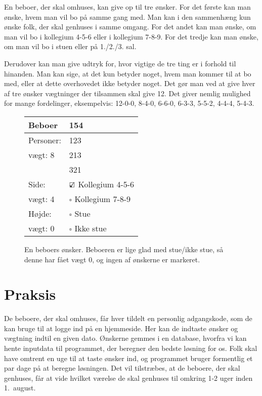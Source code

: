 \documentclass[article,oneside,11pt]{memoir}
\begin{document}
En beboer, der skal omhuses, kan give op til tre ønsker. For det første kan man
ønske, hvem man vil bo på samme gang med. Man kan i den sammenhæng kun ønske
folk, der skal genhuses i samme omgang. For det andet kan man ønske, om man vil
bo i kollegium 4-5-6 eller i kollegium 7-8-9. For
det tredje kan man ønske, om man vil bo i stuen eller på 1./2./3. sal.

Derudover kan man give udtryk for, hvor vigtige de tre ting er i forhold til
hinanden. Man kan sige, at det kun betyder noget, hvem man kommer til at bo
med, eller at dette overhovedet ikke betyder noget. Det gør man ved at give
hver af tre ønsker vægtninger der tilsammen skal give 12. Det giver nemlig
mulighed for mange fordelinger, eksempelvis: 12-0-0, 8-4-0, 6-6-0, 6-3-3,
5-5-2, 4-4-4, 5-4-3.

\begin{figure}[h]
\begin{center}
\small
\begin{tabular}{ll}
\toprule
Beboer & 154 \\
\midrule
Personer: & 123 \\
vægt: 8 & 213 \\
& 321 \\
\midrule
Side: & $\text{\rlap{$\checkmark$}}\square$ Kollegium 4-5-6 \\
vægt: 4 & $\square$ Kollegium 7-8-9 \\
\midrule
Højde: & $\square$ Stue \\
vægt: 0 & $\square$ Ikke stue \\
\bottomrule
\end{tabular}

\vspace{1em}
\begin{minipage}[t]{0.6\textwidth}
\caption{En beboers ønsker. Beboeren er lige glad med stue/ikke stue, så denne
har fået vægt 0, og ingen af ønskerne er markeret.}
\end{minipage}
\end{center}
\end{figure}

\section{Praksis}

De beboere, der skal omhuses, får hver tildelt en personlig adgangskode, som de
kan bruge til at logge ind på en hjemmeside. Her kan de indtaste ønsker og
vægtning indtil en given dato. Ønskerne gemmes i en database, hvorfra vi kan
hente inputdata til programmet, der beregner den bedste løsning for os. Folk
skal have omtrent en uge til at taste ønsker ind, og programmet bruger
formentlig et par dage på at beregne løsningen. Det vil tilstræbes, at de
beboere, der skal genhuses, får at vide hvilket værelse de skal genhuses til
omkring 1-2 uger inden 1.~august.
\end{document}
